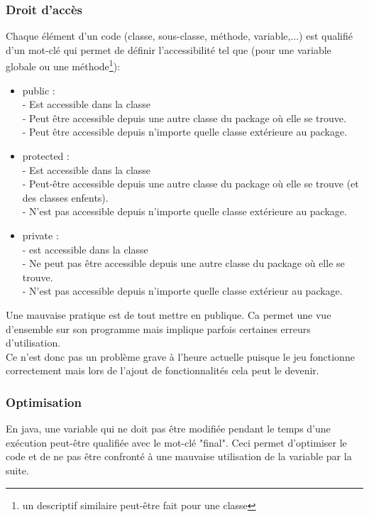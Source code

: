\documentclass[12pt,a4paper,final]{article}
\begin{document}
\subsubsection{Droit d'accès}
Chaque élément d'un code (classe, sous-classe, méthode, variable,...) est qualifié d'un mot-clé qui permet de définir l'accessibilité tel que (pour une variable globale ou une méthode\footnote{un descriptif similaire peut-être fait pour une classe}): 
\begin{itemize}
\item public : \\
- Est accessible dans la classe\\
- Peut être accessible depuis une autre classe du package où elle se trouve.\\
- Peut être accessible depuis n'importe quelle classe extérieure au package.
\item protected :\\
- Est accessible dans la classe\\
- Peut-être accessible depuis une autre classe du package où elle se trouve (et des classes enfents).\\
- N'est pas accessible depuis n'importe quelle classe extérieure au package.
\item private :\\
- est accessible dans la classe\\
- Ne peut pas être accessible depuis une autre classe du package où elle se trouve.\\
- N'est pas accessible depuis n'importe quelle classe extérieur au package.
\end{itemize}
Une mauvaise pratique est de tout mettre en publique. Ca permet une vue d'ensemble sur son programme mais implique parfois certaines erreurs d'utilisation.\\
Ce n'est donc pas un problème grave à l'heure actuelle puisque le jeu fonctionne correctement mais lors de l'ajout de fonctionnalités cela peut le devenir.

\subsubsection{Optimisation}
En java, une variable qui ne doit pas être modifiée pendant le temps d'une exécution peut-être qualifiée avec le mot-clé "final". Ceci permet d'optimiser le code et de ne pas être confronté à une mauvaise utilisation de la variable par la suite.
\end{document}

